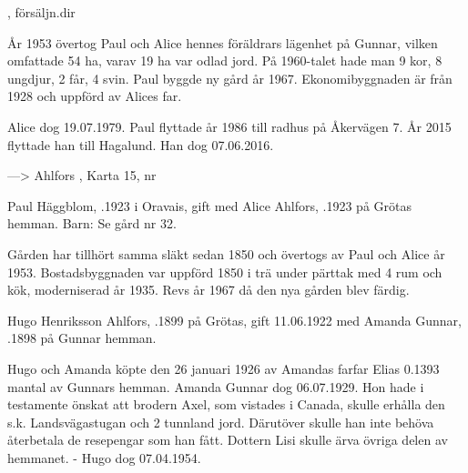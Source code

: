 \begin{jhchildren}
  \item {}
  \item {}, försäljn.dir
  \item {}
  \item {}
  \item {}
\end{jhchildren}

År 1953 övertog Paul och Alice hennes föräldrars lägenhet på Gunnar, vilken omfattade 54 ha, varav 19 ha var odlad jord. På 1960-talet hade man 9 kor, 8 ungdjur, 2 får, 4 svin. Paul byggde ny gård år 1967. Ekonomibyggnaden är från 1928 och uppförd av Alices far.

Alice dog 19.07.1979. Paul flyttade år 1986 till radhus på Åkervägen 7. År 2015 flyttade han till Hagalund. Han dog 07.06.2016.


---> Ahlfors 	, Karta 15,  nr 


Paul Häggblom, .1923 i Oravais, gift med Alice Ahlfors, .1923 på Grötas hemman. Barn: Se gård nr 32.

Gården har tillhört samma släkt sedan 1850 och övertogs av Paul och Alice år 1953. Bostadsbyggnaden var uppförd 1850 i trä under pärttak med 4 rum och kök, moderniserad år 1935. Revs år 1967 då den nya gården blev färdig.


Hugo Henriksson Ahlfors, .1899 på Grötas, gift 11.06.1922 med Amanda Gunnar, .1898 på Gunnar hemman.

\begin{jhchildren}
  \item {}
  \item {}
\end{jhchildren}

Hugo och Amanda köpte den 26 januari 1926 av Amandas farfar Elias 0.1393 mantal av Gunnars hemman. Amanda Gunnar dog 06.07.1929. Hon hade i testamente önskat att brodern Axel, som vistades i Canada, skulle erhålla den s.k. Landsvägastugan och 2 tunnland jord. Därutöver skulle han inte behöva återbetala de resepengar som han fått. Dottern Lisi skulle ärva
övriga delen av hemmanet. - Hugo dog 07.04.1954.


